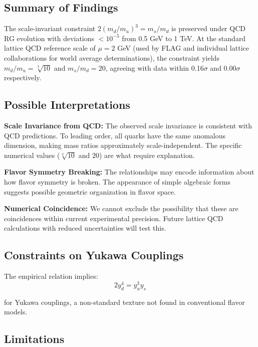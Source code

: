 \documentclass[12pt]{article}
\begin{document}
\subsection{Summary of Findings}

The scale-invariant constraint $2(m_d/m_u)^3 = m_s/m_d$ is preserved under QCD RG evolution with deviations $<10^{-5}$ from 0.5 GeV to 1 TeV. At the standard lattice QCD reference scale of $\mu = 2$ GeV (used by FLAG and individual lattice collaborations for world average determinations), the constraint yields $m_d/m_u = \sqrt[3]{10}$ and $m_s/m_d = 20$, agreeing with data within 0.16$\sigma$ and 0.00$\sigma$ respectively.

\subsection{Possible Interpretations}

\textbf{Scale Invariance from QCD:} The observed scale invariance is consistent with QCD predictions. To leading order, all quarks have the same anomalous dimension, making mass ratios approximately scale-independent. The specific numerical values ($\sqrt[3]{10}$ and $20$) are what require explanation.

\textbf{Flavor Symmetry Breaking:} The relationships may encode information about how flavor symmetry is broken. The appearance of simple algebraic forms suggests possible geometric organization in flavor space.

\textbf{Numerical Coincidence:} We cannot exclude the possibility that these are coincidences within current experimental precision. Future lattice QCD calculations with reduced uncertainties will test this.

\subsection{Constraints on Yukawa Couplings}

The empirical relation implies:
\begin{equation}
2y_d^4 = y_u^3 y_s
\end{equation}

for Yukawa couplings, a non-standard texture not found in conventional flavor models.

\subsection{Limitations}
\end{document}
